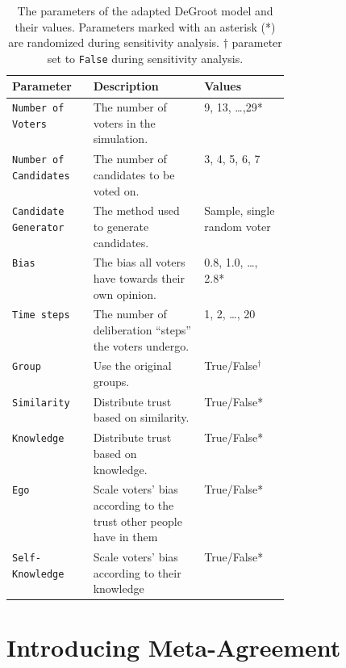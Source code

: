 \renewcommand{\arraystretch}{1.2}
\begin{table}
	\centering
	\begin{tabular}{lp{0.4\linewidth}l}
		\toprule
		Parameter                     & Description                                                         & Values                      \\
		\midrule
		\texttt{Number of Voters}     & The number of voters in the simulation.                             & 9,  13, \dots,29*           \\
		\texttt{Number of Candidates} & The number of candidates to be voted on.                            & 3, 4, 5, 6, 7               \\
		\texttt{Candidate Generator}  & The method used to generate candidates.                             & Sample, single random voter \\
		\texttt{Bias}                 & The bias all voters have towards their own opinion.                 & 0.8, 1.0, \dots, 2.8*       \\
		\texttt{Time steps}           & The number of deliberation ``steps'' the voters undergo.            & 1, 2, \dots, 20             \\
		\texttt{Group}                & Use the original groups.                                            & True/False$^\dagger$        \\
		\texttt{Similarity}           & Distribute trust based on similarity.                               & True/False*                 \\
		\texttt{Knowledge}            & Distribute trust based on knowledge.                                & True/False*                 \\
		\texttt{Ego}                  & Scale voters' bias according to the trust other people have in them & True/False*                 \\
		\texttt{Self-Knowledge}       & Scale voters' bias according to their knowledge                     & True/False*                 \\
		\bottomrule
	\end{tabular}
	\label{tab:independent_variables}
	\caption{The parameters of the adapted DeGroot model and their values.
		Parameters marked with an asterisk (*) are randomized during
		sensitivity analysis. $\dagger$
		parameter set to \texttt{False} during sensitivity analysis.
	}
\end{table}


\section{Introducing Meta-Agreement}
\label{method: meta-agreement}


